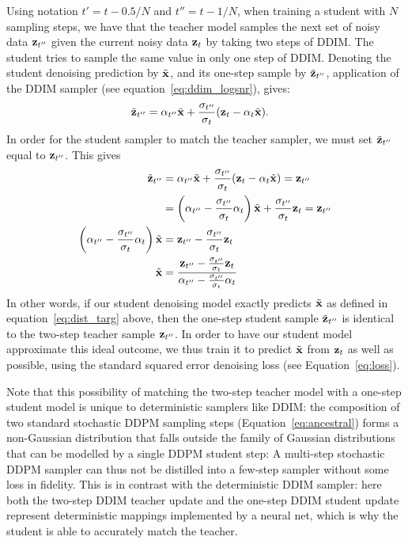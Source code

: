 \documentclass[hidelinks]{article} %
\begin{document}
Using notation $t' = t-0.5/N$ and $t'' = t-1/N$, when training a student with $N$ sampling steps, we have that the teacher model samples the next set of noisy data ${\mathbf{z}}_{t''}$ given the current noisy data ${\mathbf{z}}_{t}$ by taking two steps of DDIM. The student tries to sample the same value in only one step of DDIM. Denoting the student denoising prediction by $\tilde{\mathbf{x}}$, and its one-step sample by $\tilde{{\mathbf{z}}}_{t''}$, application of the DDIM sampler (see equation~\ref{eq:ddim_logsnr}), gives:
\begin{align}
\tilde{{\mathbf{z}}}_{t''} & = \alpha_{t''}\tilde{\mathbf{x}} + \frac{\sigma_{t''}}{\sigma_{t}}({\mathbf{z}}_t - \alpha_t\tilde{\mathbf{x}}).
\end{align}
In order for the student sampler to match the teacher sampler, we must set $\tilde{{\mathbf{z}}}_{t''}$ equal to ${\mathbf{z}}_{t''}$. This gives
\begin{align}
\tilde{{\mathbf{z}}}_{t''} &= \alpha_{t''}\tilde{\mathbf{x}} + \frac{\sigma_{t''}}{\sigma_{t}}({\mathbf{z}}_t - \alpha_t\tilde{\mathbf{x}}) = {\mathbf{z}}_{t''}\\
&= \left(\alpha_{t''} - \frac{\sigma_{t''}}{\sigma_{t}}\alpha_t\right)\tilde{\mathbf{x}} + \frac{\sigma_{t''}}{\sigma_{t}}{\mathbf{z}}_t = {\mathbf{z}}_{t''}\\
\left(\alpha_{t''} - \frac{\sigma_{t''}}{\sigma_{t}}\alpha_t\right)\tilde{\mathbf{x}} &= {\mathbf{z}}_{t''} - \frac{\sigma_{t''}}{\sigma_{t}}{\mathbf{z}}_t\\
\tilde{\mathbf{x}} &= \frac{{\mathbf{z}}_{t''} - \frac{\sigma_{t''}}{\sigma_{t}}{\mathbf{z}}_t}{\alpha_{t''} - \frac{\sigma_{t''}}{\sigma_{t}}\alpha_t} \label{eq:dist_targ}
\end{align}
In other words, if our student denoising model exactly predicts $\tilde{\mathbf{x}}$ as defined in equation~\ref{eq:dist_targ} above, then the one-step student sample $\tilde{{\mathbf{z}}}_{t''}$ is identical to the two-step teacher sample ${\mathbf{z}}_{t''}$. In order to have our student model approximate this ideal outcome, we thus train it to predict $\tilde{\mathbf{x}}$ from ${\mathbf{z}}_t$ as well as possible, using the standard squared error denoising loss (see Equation~\ref{eq:loss}).

Note that this possibility of matching the two-step teacher model with a one-step student model is unique to deterministic samplers like DDIM: the composition of two standard stochastic DDPM sampling steps (Equation~\ref{eq:ancestral}) forms a non-Gaussian distribution that falls outside the family of Gaussian distributions that can be modelled by a single DDPM student step: A multi-step stochastic DDPM sampler can thus not be distilled into a few-step sampler without some loss in fidelity. This is in contrast with the deterministic DDIM sampler: here both the two-step DDIM teacher update and the one-step DDIM student update represent deterministic mappings implemented by a neural net, which is why the student is able to accurately match the teacher.
\end{document}
